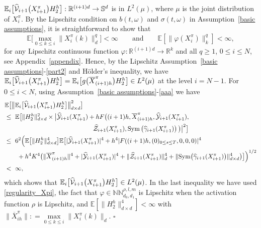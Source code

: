 \documentclass[12pt]{article}
\numberwithin{equation}{section}
\newcommand{\abs}[1]{\lvert#1\rvert}
\newcommand{\norm}[1]{\lVert#1\rVert}
\newenvironment{Proof}{\removelastskip\par\medskip \noindent{\em Proof.} \rm}{\penalty-20\null\hfill$\square$\par\medbreak}
\newcommand{\E}{\mathbb{E}}
\newcommand{\real}{\mathbb{R}}
\begin{document}
\begin{Proof}
$\E_i\big[\widehat{\cal V}_{i+1}\big(X^\pi_{i+1}\big)H_2^h\big]:
\real^{(i+1)d} \to \mathbb{S}^d$
is in $L^2(\mu)$, where $\mu$ is the joint distribution of
 $X^\pi_i$. %
By the Lipschitz condition on $b (t, \omega)$ and $\sigma (t, \omega)$
 in Assumption~\ref{basic assumptions},
 it is straightforward to show that
\begin{equation}
\label{regularity_Xpi}
\E \Big[\max\limits_{0 \leq k \leq i} \norm{X^\pi_i(k)}_d^q\Big] < \infty
\qquad \text{and} \qquad
\E \left[\norm{\varphi(X^\pi_i)}_k^q\right] < \infty,
\end{equation}
for any Lipschitz continuous function $\varphi:\real^{(i+1)d} \to \real^k$
and all $q \ge 1$, $0 \leq i \leq N$, see Appendix~\ref{appendix}.
    Hence, by the Lipschitz Assumption~\ref{basic assumptions}-\eqref{part2}
 and H\"older's inequality, we have
$\E_i\big[\widehat{\cal V}_{i+1}\big(X^\pi_{i+1}\big)H_2^h\big]
= \E_i\big[g\big( \overline{X}^\pi_{(i+1)h}\big)H_2^h\big]
\in L^2(\mu)$ at the level $i = N-1$.
For $0 \leq i < N$, using Assumption~\ref{basic assumptions}-\eqref{aaa} we have
\begin{align*}
    & \E \big[ \big\lVert \E_i\big[\widehat{\cal V}_{i+1}\big(X^\pi_{i+1}\big)
        H_2^h\big]\big\rVert_{d\times d}^2 \big]
    \\
      &\leq \ \E \bigl[  \norm{H_2^h}_{d\times d}^2 \times
                \bigl\lvert \widehat{\cal Y}_{i+1}(X^\pi_{i+1})
                    + h F\big( (i+1)h, \overline{X}^\pi_{(i+1)h},
                \widehat{\cal Y}_{i+1}(X^\pi_{i+1}),
    \\
      &\qquad \qquad \qquad \qquad \qquad \qquad \qquad
                \widehat{\cal Z}_{i+1}(X^\pi_{i+1}),
                {\rm Sym} \left( \widehat{\cal \gamma}_{i+1}(X^\pi_{i+1})
                \right)\big) \bigr\rvert^2
                        \bigr]
    \\
      &\leq \ 6^2 \Bigl( \E \bigl[\norm{H_2^h}_{d\times d}^4 \bigr]
      \E\bigl[  \abs{\widehat{\cal Y}_{i+1}(X^\pi_{i+1})}^4
          + h^4 \abs{F((i+1)h, (0)_{0 \leq s \leq T}, 0, 0,0)}^4
    \\
      &\quad\quad
      + h^4 K^4 \bigl(\norm{\overline{X}^\pi_{(i+1)h}}^4
          +\abs{\widehat{\cal Y}_{i+1}(X^\pi_{i+1})}^4
          +\norm{\widehat{\cal Z}_{i+1}(X^\pi_{i+1})}_d^4
          +\norm{{\rm Sym} \big( \widehat{\cal \gamma}_{i+1}(X^\pi_{i+1})
      \big)}_{d\times d}^4\bigr) \bigr] \Bigr)^{1/2}
    \\
      &< \ \infty,
\end{align*}
which shows that
$\E_i\big[\widehat{\cal V}_{i+1}\big(X^\pi_{i+1}\big)H_2^h\big]\in L^2(\mu)$.
In the last inequality we have used
\eqref{regularity_Xpi}, the fact that
$\varphi \in \mathbb{NN}^{\rho,l ,m}_{d_0, d_1}$
is Lipschitz when the activation function $\rho$ is Lipschitz,
 and $\E \left[ \norm{H^h_2}_{d\times d}^4 \right] < \infty$
 with $\norm{\overline{X}^\pi_{ih}} : = \max\limits_{0 \leq k \leq i} \norm{X^\pi_i(k)}_d$.
\end{Proof}
\end{document}
